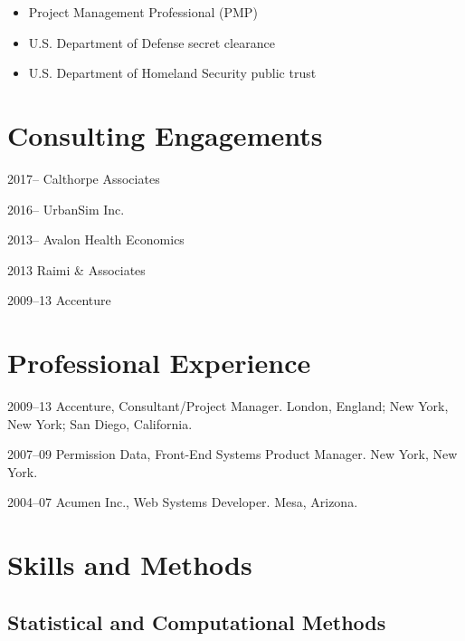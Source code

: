 \documentclass{academiccv}
\begin{document}
\begin{itemize}
\item Project Management Professional (PMP)
\item U.S. Department of Defense secret clearance
\item U.S. Department of Homeland Security public trust
\end{itemize}



\section*{Consulting Engagements}

\begin{tablist}
\item[2017--]   \tab Calthorpe Associates
\item[2016--]   \tab UrbanSim Inc.
\item[2013--]   \tab Avalon Health Economics
\item[2013]     \tab Raimi \& Associates
\item[2009--13] \tab Accenture
\end{tablist}



\section*{Professional Experience}

\begin{tablist}

\item[2009--13] \tab Accenture, Consultant/Project Manager. London, England; New York, New York; San Diego, California.

\item[2007--09] \tab Permission Data, Front-End Systems Product Manager. New York, New York.

\item[2004--07] \tab Acumen Inc., Web Systems Developer. Mesa, Arizona.
\end{tablist}



\section*{Skills and Methods}

\subsection*{Statistical and Computational Methods}
\end{document}
